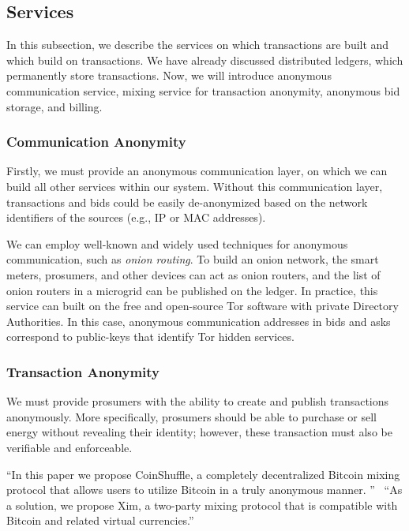 \subsection{Services}

In this subsection, we describe the services on which transactions are built and which build on transactions.
We have already discussed distributed ledgers, which permanently store transactions.
Now, we will introduce anonymous communication service, mixing service for transaction anonymity, anonymous bid storage, and billing.

\subsubsection{Communication Anonymity}
Firstly, we must provide an anonymous communication layer, on which we can build all other services within our system.
Without this communication layer, transactions and bids could be easily de-anonymized based on the network identifiers of the sources (e.g., IP or MAC addresses).

We can employ well-known and widely used techniques for anonymous communication, such as \emph{onion routing}.
To build an onion network, the smart meters, prosumers, and other devices can act as onion routers, and the list of onion routers in a microgrid can be published on the ledger.
In practice, this service can built on 
 the free and open-source Tor software with private Directory Authorities.
In this case, anonymous communication addresses in bids and asks correspond to public-keys that identify Tor hidden services.

\subsubsection{Transaction Anonymity}
We must provide prosumers with the ability to create and publish transactions anonymously.
More specifically, prosumers should be able to purchase or sell energy without revealing their identity; however, these transaction must also be verifiable and enforceable.

``In this paper we propose CoinShuffle, a completely decentralized Bitcoin mixing protocol that allows users to utilize Bitcoin in a truly anonymous manner. ''~\cite{ruffing2014coinshuffle}
``As a solution, we propose Xim, a two-party mixing protocol that is compatible with Bitcoin and related virtual currencies.''~\cite{bissias2014sybil}

